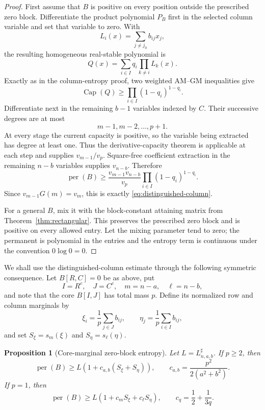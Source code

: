 \documentclass[11pt,a4paper]{article}
\numberwithin{equation}{section}
\newtheorem{proposition}[theorem]{Proposition}
\theoremstyle{definition}
\newcommand{\per}{\operatorname{per}}
\newcommand{\pcap}{\operatorname{Cap}}
\newcommand{\1}{\mathbf{1}}
\begin{document}
\begin{proof}
First assume that $B$ is positive on every position outside the prescribed
zero block.  Differentiate the product polynomial $P_B$ first in the
selected column variable and set that variable to zero.  With
\[
 L_i(x)=\sum_{j\ne j_0}b_{ij}x_j,
\]
the resulting homogeneous real-stable polynomial is
\[
 Q(x)=\sum_{i\in I}q_i\prod_{k\ne i}L_k(x).
\]
Exactly as in the column-entropy proof, two weighted AM--GM inequalities give
\[
 \pcap(Q)\ge\prod_{i\in I}(1-q_i)^{1-q_i}.
\]
Differentiate next in the remaining $b-1$ variables indexed by $C$.
Their successive degrees are at most
\[
 m-1,m-2,\dots,p+1.
\]
At every stage the current capacity is positive, so the variable being
extracted has degree at least one.  Thus the derivative-capacity theorem is
applicable at each step and supplies
$v_{m-1}/v_p$.  Square-free coefficient extraction in the remaining
$n-b$ variables supplies $v_{n-b}$.  Therefore
\[
 \per(B)\ge
 \frac{v_{m-1}v_{n-b}}{v_p}
 \prod_{i\in I}(1-q_i)^{1-q_i}.
\]
Since $v_{m-1}G(m)=v_m$, this is exactly
\eqref{eq:distinguished-column}.

For a general $B$, mix it with the block-constant attaining matrix from
Theorem~\ref{thm:rectangular}.  This preserves the prescribed zero block and
is positive on every allowed entry.  Let the mixing parameter tend to zero;
the permanent is polynomial in the entries and the entropy term is continuous
under the convention $0\log0=0$.
\end{proof}

We shall use the distinguished-column estimate through the following
symmetric consequence.  Let $B[R,C]=0$ be as above, put
\[
 I=R^c,\quad J=C^c,\quad m=n-a,\quad \ell=n-b,
\]
and note that the core $B[I,J]$ has total mass $p$.  Define its normalized
row and column marginals by
\[
 \xi_i=\frac1p\sum_{j\in J}b_{ij},
 \qquad
 \eta_j=\frac1p\sum_{i\in I}b_{ij},
\]
and set $S_\xi=s_m(\xi)$ and $S_\eta=s_\ell(\eta)$.

\begin{proposition}[Core-marginal zero-block entropy]
\label{prop:core-marginal-entropy}
Let $L=L^{\sharp}_{n,a,b}$.  If $p\ge2$, then
\begin{equation}\label{eq:core-entropy-general}
 \per(B)\ge
 L\left(1+c_{a,b}(S_\xi+S_\eta)\right),
 \qquad
 c_{a,b}=\frac{p^2}{2(a^2+b^2)}.
\end{equation}
If $p=1$, then
\begin{equation}\label{eq:core-entropy-p1}
 \per(B)\ge
 L\left(1+c_mS_\xi+c_\ell S_\eta\right),
 \qquad c_q=\frac12+\frac1{3q}.
\end{equation}
\end{proposition}
\end{document}
